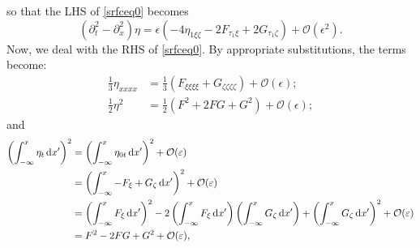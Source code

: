\documentclass[11pt,reqno,oneside,a4paper]{article}
\begin{document}
so that the LHS of \eqref{srfceq0} becomes
\begin{equation}
(\partial_t^2 - \partial_x^2) \eta =  \epsilon \left(- 4\eta_{1\xi \zeta} - 2F_{\tau_1 \xi} + 2G_{\tau_1 \zeta} \right) + \mathcal{O}(\epsilon^2). \label{LHS1}
\end{equation}
Now, we deal with the RHS of \eqref{srfceq0}. By appropriate substitutions, the terms become:
\begin{align*}
\frac{1}{3}\eta_{xxxx} &= \frac{1}{3}(F_{\xi\xi\xi\xi} + G_{\zeta\zeta\zeta\zeta}) + \mathcal{O}(\epsilon); \\
\frac{1}{2}\eta^2 &= \frac{1}{2} (F^2 + 2FG +G^2) + \mathcal{O}(\epsilon);
\end{align*}
and 
\begin{align*}
\left( \int^{x}_{-\infty} \eta_t \,\mathrm{d} x' \right)^2 &= \left( \int^{x}_{-\infty} \eta_{0t} \,\mathrm{d} x' \right)^2 + \mathcal{O}(\varepsilon) \\
&= \left( \int^{x}_{-\infty}-F_\xi + G_\zeta \,\mathrm{d} x' \right)^2 + \mathcal{O}(\varepsilon)\\
&= \left( \int^{x}_{-\infty}F_\xi \,\mathrm{d} x'\right)^2 - 2\left( \int^{x}_{-\infty}F_\xi \,\mathrm{d} x'\right)\left( \int^{x}_{-\infty}G_\zeta \,\mathrm{d} x'\right) + \left( \int^{x}_{-\infty} G_\zeta \,\mathrm{d} x'\right)^2 + \mathcal{O}(\varepsilon) \\
&= F^2 - 2FG + G^2 + \mathcal{O}(\varepsilon),
\end{align*}
\end{document}
